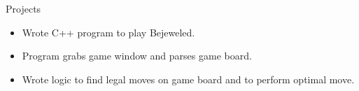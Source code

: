 \begin{category}{Projects}
\begin{itemize}
\item Wrote C++ program to play Bejeweled.
\item Program grabs game window and parses game board.
\item Wrote logic to find legal moves on game board and to perform optimal move.
\end{itemize}




\end{category}

